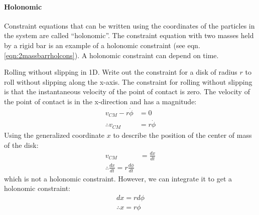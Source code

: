 \paragraph{Holonomic}
Constraint equations that can be written using the coordinates of the particles in the system are called ``holonomic''. The constraint equation with two masses held by a rigid bar is an example of a holonomic constraint (see eqn. \ref{eqn:2massbarrholcons}). A holonomic constraint can depend on time.
\begin{example}{0pt}{Rolling without slipping in 1D. Write out the constraint for a disk of radius $r$  to roll without slipping along the x-axis.}{}
The constraint for rolling without slipping is that the instantaneous velocity of the point of contact is zero. The velocity of the point of contact is in the x-direction and has a magnitude:
\begin{align*}
v_{CM}-r\dot{\phi}&=0\nonumber\\
\therefore v_{CM}&=r\dot{\phi}
\end{align*}
Using the generalized coordinate $x$ to describe the position of the center of mass of the disk:
\begin{align*}
v_{CM}&=\frac{dx}{dt}\nonumber\\
\therefore \frac{dx}{dt}=r\frac{d\phi}{dt}
\end{align*}
which is not a holonomic constraint. However, we can integrate it to get a holonomic constraint:
\begin{align*}
dx=rd\phi\nonumber\\
\therefore x=r\phi
\end{align*}
\end{example}

